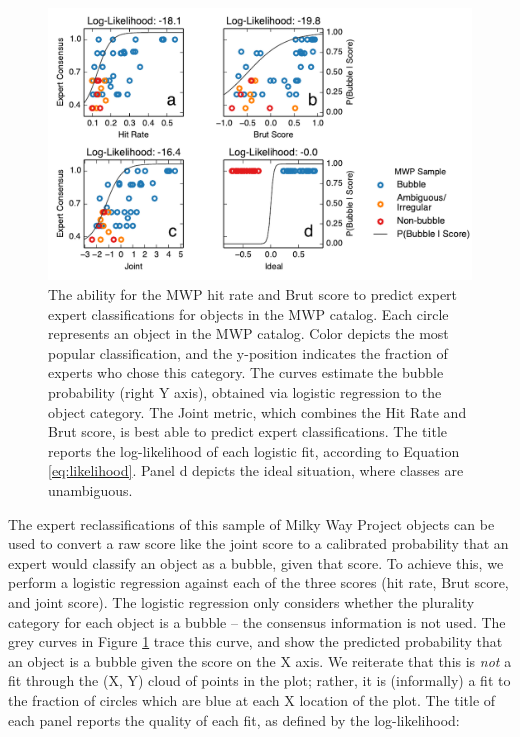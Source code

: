 \begin{figure}
\includegraphics[width=6in]{expert_mwp_score}
\caption{The ability for the MWP hit rate and Brut score to predict expert expert classifications for objects in the MWP catalog. Each circle represents an object in the MWP catalog. Color depicts the most popular classification, and the y-position indicates the fraction of experts who chose this category. The curves estimate the bubble probability (right Y axis), obtained via logistic regression to the object category. The Joint metric, which combines the Hit Rate and Brut score, is best able to predict expert classifications. The title reports the log-likelihood of each logistic fit, according to Equation \ref{eq:likelihood}. Panel d depicts the ideal situation, where classes are unambiguous.}
\label{fig:expert_mwp_score}
\end{figure}

The expert reclassifications of this sample of Milky Way Project objects can be used to convert a raw score like the joint score to a calibrated probability that an expert would classify an object as a bubble, given that score. To achieve this, we perform a logistic regression against each of the three scores (hit rate, Brut score, and joint score). The logistic regression only considers whether the plurality category for each object is a bubble -- the consensus information is not used. The grey curves in Figure \ref{fig:expert_mwp_score} trace this curve, and show the predicted probability that an object is a bubble given the score on the X axis. We reiterate that this is \emph{not} a fit through the (X, Y) cloud of points in the plot; rather, it is (informally) a fit to the fraction of circles which are blue at each X location of the plot. The title of each panel reports the quality of each fit, as defined by the log-likelihood:

